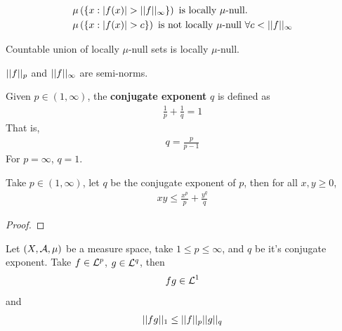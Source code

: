 \documentclass[11pt]{article}
\begin{document}
	\begin{proposition}
		\begin{align}
			&\mu\left(\{
			x : \left \vert {f(x)} \right \vert > \vert \vert {f} \vert \vert_\infty
			\}\right) \text{{ is locally $\mu$-null.}} \\
			&\mu\left(\{
			x : \left \vert {f(x)} \right \vert > c
			\}\right) \text{{ is not locally $\mu$-null }} \forall c < \vert \vert {f} \vert \vert_\infty
		\end{align}
	\end{proposition}
	
	\begin{lemma}
		Countable union of locally $\mu$-null sets is locally $\mu$-null.
	\end{lemma}
	
	\begin{proposition}
		$\vert \vert {f} \vert \vert_p$ and $\vert \vert {f} \vert \vert_\infty$ are semi-norms.
	\end{proposition}
	
	\begin{definition}
		Given $p \in (1, \infty)$, the \textbf{conjugate exponent} $q$ is defined as
		\begin{align}
			\frac{1}{p} + \frac{1}{q} = 1
		\end{align}
		That is,
		\begin{align}
			q = \frac{p}{p-1}
		\end{align}
		For $p = \infty$, $q=1$.
	\end{definition}
	
	\begin{lemma}
		Take $p \in (1, \infty)$, let $q$ be the conjugate exponent of $p$, then for all $x, y \geq 0$,
		\begin{align}
			x y \leq \frac{x^p}{p} + \frac{y^q}{q}
		\end{align}
		\begin{proof}
			
		\end{proof}
	\end{lemma}
	
	\begin{theorem}
		Let $(X, \mathcal{{A}}, \mu)$ be a measure space, take $1 \leq p \leq \infty$, and $q$ be it's conjugate exponent. Take $f \in \mathcal{{L}}^p$, $g \in \mathcal{{L}}^q$, then
		\begin{align}
			fg \in \mathcal{{L}}^1
		\end{align}
		and
		\begin{align}
			\vert \vert {fg} \vert \vert_1 \leq \vert \vert {f} \vert \vert_p \vert \vert {g} \vert \vert_q
		\end{align}
	\end{theorem}
	
\end{document}
